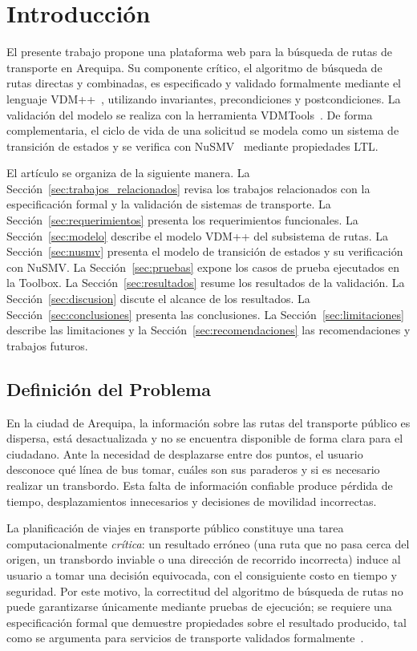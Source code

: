 \section{Introducción}
\label{sec:introduccion}

El presente trabajo propone una plataforma web para la búsqueda de rutas de transporte en Arequipa. Su componente crítico, el algoritmo de búsqueda de rutas directas y combinadas, es especificado y validado formalmente mediante el lenguaje VDM++~\cite{fitzgerald2008}, utilizando invariantes, precondiciones y postcondiciones. La validación del modelo se realiza con la herramienta VDMTools~\cite{fitzgerald2008}. De forma complementaria, el ciclo de vida de una solicitud se modela como un sistema de transición de estados y se verifica con NuSMV~\cite{nusmv} mediante propiedades LTL.

El artículo se organiza de la siguiente manera. La Sección~\ref{sec:trabajos_relacionados} revisa los trabajos relacionados con la especificación formal y la validación de sistemas de transporte. La Sección~\ref{sec:requerimientos} presenta los requerimientos funcionales. La Sección~\ref{sec:modelo} describe el modelo VDM++ del subsistema de rutas. La Sección~\ref{sec:nusmv} presenta el modelo de transición de estados y su verificación con NuSMV. La Sección~\ref{sec:pruebas} expone los casos de prueba ejecutados en la Toolbox. La Sección~\ref{sec:resultados} resume los resultados de la validación. La Sección~\ref{sec:discusion} discute el alcance de los resultados. La Sección~\ref{sec:conclusiones} presenta las conclusiones. La Sección~\ref{sec:limitaciones} describe las limitaciones y la Sección~\ref{sec:recomendaciones} las recomendaciones y trabajos futuros.

\subsection{Definición del Problema}
\label{sec:problema}

En la ciudad de Arequipa, la información sobre las rutas del transporte público es dispersa, está desactualizada y no se encuentra disponible de forma clara para el ciudadano. Ante la necesidad de desplazarse entre dos puntos, el usuario desconoce qué línea de bus tomar, cuáles son sus paraderos y si es necesario realizar un transbordo. Esta falta de información confiable produce pérdida de tiempo, desplazamientos innecesarios y decisiones de movilidad incorrectas.

La planificación de viajes en transporte público constituye una tarea computacionalmente \emph{crítica}: un resultado erróneo (una ruta que no pasa cerca del origen, un transbordo inviable o una dirección de recorrido incorrecta) induce al usuario a tomar una decisión equivocada, con el consiguiente costo en tiempo y seguridad. Por este motivo, la correctitud del algoritmo de búsqueda de rutas no puede garantizarse únicamente mediante pruebas de ejecución; se requiere una especificación formal que demuestre propiedades sobre el resultado producido, tal como se argumenta para servicios de transporte validados formalmente~\cite{iqbal2022taxi}.

